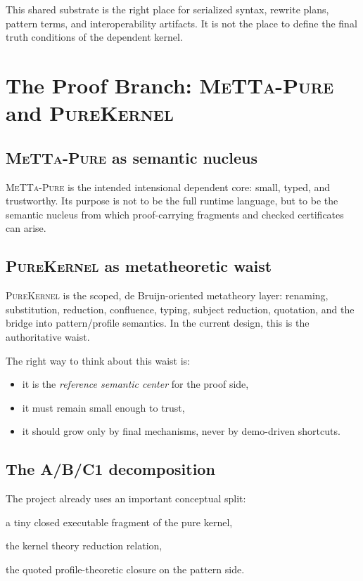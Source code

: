 \documentclass[11pt]{article}
\newcommand{\pure}{\textsc{MeTTa-Pure}}
\newcommand{\purekernel}{\textsc{PureKernel}}
\begin{document}
This shared substrate is the right place for serialized syntax, rewrite plans, pattern terms, and interoperability artifacts. It is not the place to define the final truth conditions of the dependent kernel.

\section{The Proof Branch: \pure{} and \purekernel{}}
\subsection{\pure{} as semantic nucleus}
\pure{} is the intended intensional dependent core: small, typed, and trustworthy. Its purpose is not to be the full runtime language, but to be the semantic nucleus from which proof-carrying fragments and checked certificates can arise.

\subsection{\purekernel{} as metatheoretic waist}
\purekernel{} is the scoped, de Bruijn-oriented metatheory layer: renaming, substitution, reduction, confluence, typing, subject reduction, quotation, and the bridge into pattern/profile semantics. In the current design, this is the authoritative waist.

The right way to think about this waist is:
\begin{itemize}
  \item it is the \emph{reference semantic center} for the proof side,
  \item it must remain small enough to trust,
  \item it should grow only by final mechanisms, never by demo-driven shortcuts.
\end{itemize}

\subsection{The A/B/C1 decomposition}
The project already uses an important conceptual split:
\begin{description}[leftmargin=2.2cm,style=nextline]
  \item[A] a tiny closed executable fragment of the pure kernel,
  \item[B] the kernel theory reduction relation,
  \item[C1] the quoted profile-theoretic closure on the pattern side.
\end{description}
\end{document}
